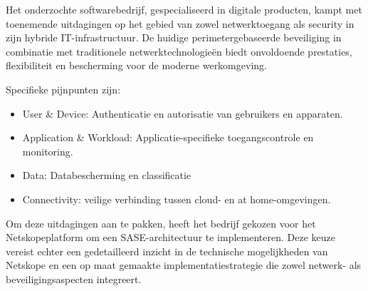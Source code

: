 
Het onderzochte softwarebedrijf, gespecialiseerd in digitale producten, kampt met toenemende uitdagingen op het gebied van zowel netwerktoegang als security in zijn hybride IT-infrastructuur. De huidige perimetergebaseerde beveiliging in combinatie met traditionele netwerktechnologieën biedt onvoldoende prestaties, flexibiliteit en bescherming voor de moderne werkomgeving.

Specifieke pijnpunten zijn:

\begin{itemize}
  \item User \& Device: Authenticatie en autorisatie van gebruikers en apparaten.
	\item Application \& Workload: Applicatie-specifieke toegangscontrole en monitoring.
  \item Data: Databescherming en classificatie
  \item Connectivity: veilige verbinding tussen cloud- en at home-omgevingen.
\end{itemize}

Om deze uitdagingen aan te pakken, heeft het bedrijf gekozen voor het Netskopeplatform om een SASE-architectuur te implementeren. Deze keuze vereist echter een gedetailleerd inzicht in de technische mogelijkheden van Netskope en een op maat gemaakte implementatiestrategie die zowel netwerk- als beveiligingsaspecten integreert.

\section{}%
\label{sec:onderzoeksvraag}


